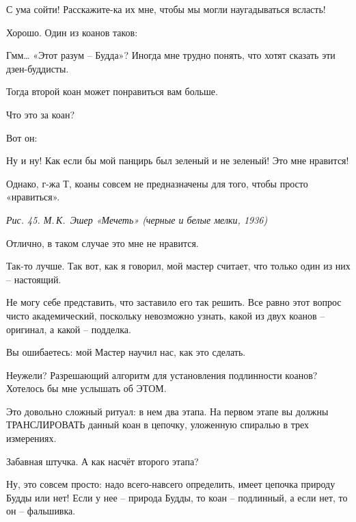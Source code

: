 \documentclass[../main.tex]{subfiles}
\begin{document}
\begin{dialogue}
 С ума сойти! Расскажите-ка их мне, чтобы мы могли наугадываться всласть!

 Хорошо. Один из коанов таков:


 Гмм\ldots{} «Этот разум \--- Будда»? Иногда мне трудно понять, что хотят сказать эти дзен-буддисты.

 Тогда второй коан может понравиться вам больше.

 Что это за коан?

 Вот он:


 Ну и ну! Как если бы мой панцирь был зеленый и не зеленый! Это мне нравится!

 Однако, г-жа Т, коаны совсем не предназначены для того, чтобы просто «нравиться».

\emph{Рис. 45. М.\,К.~Эшер «Мечеть» (черные и белые мелки, 1936)}

 Отлично, в таком случае это мне не нравится.

 Так-то лучше. Так вот, как я говорил, мой мастер считает, что только один из них \--- настоящий.

 Не могу себе представить, что заставило его так решить. Все равно этот вопрос чисто академический, поскольку невозможно узнать, какой из двух коанов \--- оригинал, а какой \--- подделка.

 Вы ошибаетесь: мой Мастер научил нас, как это сделать.

 Неужели? Разрешающий алгоритм для установления подлинности коанов? Хотелось бы мне услышать об ЭТОМ.

 Это довольно сложный ритуал: в нем два этапа. На первом этапе вы должны ТРАНСЛИРОВАТЬ данный коан в цепочку, уложенную спиралью в трех измерениях.

 Забавная штучка. А как насчёт второго этапа?

 Ну, это совсем просто: надо всего-навсего определить, имеет цепочка природу Будды или нет! Если у нее \--- природа Будды, то коан \--- подлинный, а если нет, то он \--- фальшивка.


\end{dialogue}
\end{document}
